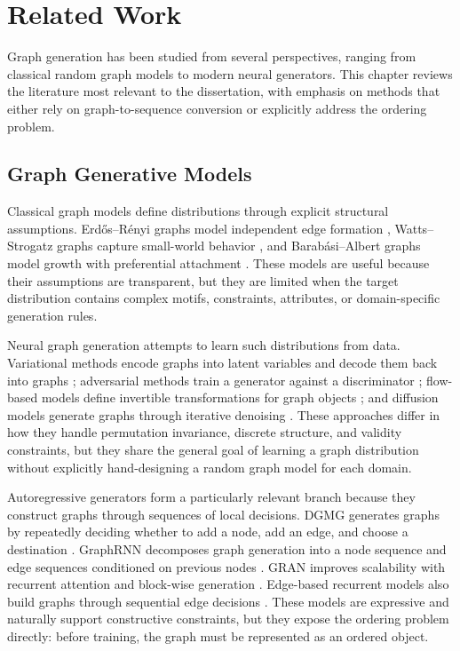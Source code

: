 \chapter{Related Work}
\label{chap:related-work}

Graph generation has been studied from several perspectives, ranging from classical random graph models to modern neural generators. This chapter reviews the literature most relevant to the dissertation, with emphasis on methods that either rely on graph-to-sequence conversion or explicitly address the ordering problem.

\section{Graph Generative Models}
\label{sec:related-graph-generative-models}

Classical graph models define distributions through explicit structural assumptions. Erd\H{o}s--R\'enyi graphs model independent edge formation \cite{erdos1960evolution}, Watts--Strogatz graphs capture small-world behavior \cite{watts1998collective}, and Barab\'asi--Albert graphs model growth with preferential attachment \cite{barabasi1999emergence}. These models are useful because their assumptions are transparent, but they are limited when the target distribution contains complex motifs, constraints, attributes, or domain-specific generation rules.

Neural graph generation attempts to learn such distributions from data. Variational methods encode graphs into latent variables and decode them back into graphs \cite{kipf2016vgae,simonovsky2018graphvae}; adversarial methods train a generator against a discriminator \cite{goodfellow2014generative,bojchevski2018netgan}; flow-based models define invertible transformations for graph objects \cite{shi2020graphaf}; and diffusion models generate graphs through iterative denoising \cite{vignac2023digress,chen2023edge}. These approaches differ in how they handle permutation invariance, discrete structure, and validity constraints, but they share the general goal of learning a graph distribution without explicitly hand-designing a random graph model for each domain.

Autoregressive generators form a particularly relevant branch because they construct graphs through sequences of local decisions. DGMG generates graphs by repeatedly deciding whether to add a node, add an edge, and choose a destination \cite{li2018learning}. GraphRNN decomposes graph generation into a node sequence and edge sequences conditioned on previous nodes \cite{you2018graphrnn}. GRAN improves scalability with recurrent attention and block-wise generation \cite{liao2020gran}. Edge-based recurrent models also build graphs through sequential edge decisions \cite{bacciu2019edgegraphgen}. These models are expressive and naturally support constructive constraints, but they expose the ordering problem directly: before training, the graph must be represented as an ordered object.

